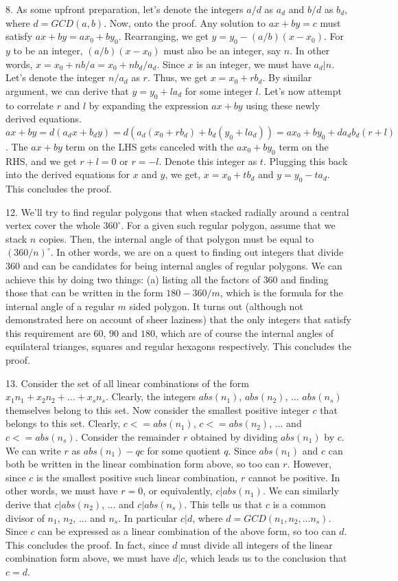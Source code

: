 \documentclass{article}
\begin{document}
8. As some upfront preparation, let's denote the integers $a / d$ as $a_d$ and $b / d$ as $b_d$, where $d = GCD(a, b)$. Now, onto the proof. Any solution to $ax + by = c$ must satisfy $ax + by = ax_0 + by_0$. Rearranging, we get $y = y_0 - (a / b)(x - x_0)$. For $y$ to be an integer, $(a / b)(x - x_0)$ must also be an integer, say $n$. In other words, $x = x_0 + nb / a = x_0 + nb_d / a_d$. Since $x$ is an integer, we must have $a_d | n$. Let's denote the integer $n / a_d$ as $r$. Thus, we get $x = x_0 + rb_d$. By similar argument, we can derive that $y = y_0 + la_d$ for some integer $l$. Let's now attempt to correlate $r$ and $l$ by expanding the expression $ax + by$ using these newly derived equations. $ax + by = d(a_dx + b_dy) = d(a_d(x_0 + rb_d) + b_d(y_0 + la_d)) = ax_0 + by_0 + da_db_d(r + l)$. The $ax + by$ term on the LHS gets canceled with the $ax_0 + by_0$ term on the RHS, and we get $r + l = 0$ or $r = -l$. Denote this integer as $t$. Plugging this back into the derived equations for $x$ and $y$, we get, $x = x_0 + tb_d$ and $y = y_0 - ta_d$. This concludes the proof.

12. We'll try to find regular polygons that when stacked radially around a central vertex cover the whole $360^\circ$. For a given such regular polygon, assume that we stack $n$ copies. Then, the internal angle of that polygon must be equal to $(360 / n)^\circ$. In other words, we are on a quest to finding out integers that divide $360$ and can be candidates for being internal angles of regular polygons. We can achieve this by doing two things: (a) listing all the factors of $360$ and finding those that can be written in the form $180 - 360 / m$, which is the formula for the internal angle of a regular $m$ sided polygon. It turns out (although not demonstrated here on account of sheer laziness) that the only integers that satisfy this requirement are $60$, $90$ and $180$, which are of course the internal angles of equilateral trianges, squares and regular hexagons respectively. This concludes the proof.

13. Consider the set of all linear combinations of the form $x_1n_1 + x_2n_2 + ... + x_sn_s$. Clearly, the integers $abs(n_1)$, $abs(n_2)$, ... $abs(n_s)$ themselves belong to this set. Now consider the smallest positive integer $c$ that belongs to this set. Clearly, $c <= abs(n_1)$, $c <= abs(n_2)$, ... and $c <= abs(n_s)$. Consider the remainder $r$ obtained by dividing $abs(n_1)$ by $c$. We can write $r$ as $abs(n_1) - qc$ for some quotient $q$. Since $abs(n_1)$ and $c$ can both be written in the linear combination form above, so too can $r$. However, since $c$ is the smallest positive such linear combination, $r$ cannot be positive. In other words, we must have $r = 0$, or equivalently, $c | abs(n_1)$. We can similarly derive that $c | abs(n_2)$, ... and $c | abs(n_s)$. This tells us that $c$ is a common divisor of $n_1$, $n_2$, ... and $n_s$. In particular $c | d$, where $d = GCD(n_1, n_2, ...n_s)$. Since $c$ can be expressed as a linear combination of the above form, so too can $d$. This concludes the proof. In fact, since $d$ must divide all integers of the linear combination form above, we must have $d | c$, which leads us to the conclusion that $c = d$.
\end{document}
